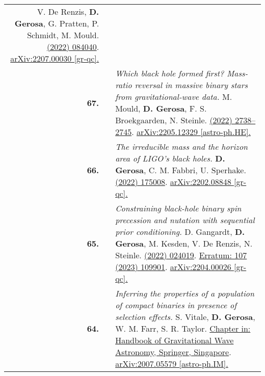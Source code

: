 {\begin{longtable}{rp{0.3cm}p{15.8cm}}
\newline{}
V. De Renzis, \textbf{D. Gerosa}, G. Pratten, P. Schmidt, M. Mould.
\newline{}
\href{https://journals.aps.org/prd/abstract/10.1103/PhysRevD.106.084040}{\prd 106 (2022) 084040}. \href{https://arxiv.org/abs/2207.00030}{arXiv:2207.00030 [gr-qc].}
\vspace{0.09cm}\\
%
\textbf{67.} & & \textit{Which black hole formed first? Mass-ratio reversal in massive binary stars from gravitational-wave data.}
\newline{}
M. Mould, \textbf{D. Gerosa}, F. S. Broekgaarden, N. Steinle.
\newline{}
\href{https://doi.org/10.1093/mnras/stac2859}{\mnras 517 (2022) 2738–2745}. \href{https://arxiv.org/abs/2205.12329}{arXiv:2205.12329 [astro-ph.HE].}
\vspace{0.09cm}\\
%
\textbf{66.} & & \textit{The irreducible mass and the horizon area of LIGO's black holes.}
\newline{}
\textbf{D. Gerosa}, C. M. Fabbri, U. Sperhake.
\newline{}
\href{https://iopscience.iop.org/article/10.1088/1361-6382/ac8332}{\cqg 39 (2022) 175008}. \href{https://arxiv.org/abs/2202.08848}{arXiv:2202.08848 [gr-qc].}
\vspace{0.09cm}\\
%
\textbf{65.} & & \textit{Constraining black-hole binary spin precession and nutation with sequential prior conditioning.}
\newline{}
D. Gangardt, \textbf{D. Gerosa}, M. Kesden, V. De Renzis, N. Steinle.
\newline{}
\href{https://journals.aps.org/prd/abstract/10.1103/PhysRevD.106.024019}{\prd 106 (2022) 024019}. \href{https://journals.aps.org/prd/abstract/10.1103/PhysRevD.107.109901}{Erratum: 107 (2023) 109901}. \href{https://arxiv.org/abs/2204.00026}{arXiv:2204.00026 [gr-qc].}
\vspace{0.09cm}\\
%
\textbf{64.} & & \textit{Inferring the properties of a population of compact binaries in presence of selection effects.}
\newline{}
S. Vitale, \textbf{D. Gerosa}, W. M. Farr, S. R. Taylor.
\newline{}
\href{https://doi.org/10.1007/978-981-15-4702-7_45-1}{Chapter in: Handbook of Gravitational Wave Astronomy, Springer, Singapore}. \href{https://arxiv.org/abs/2007.05579}{arXiv:2007.05579 [astro-ph.IM].}

\end{longtable}}

